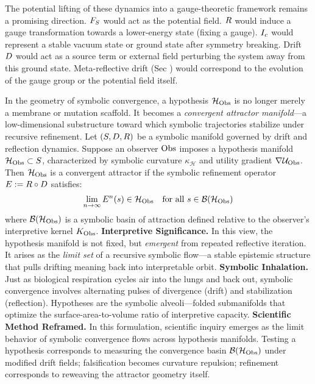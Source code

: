 \begin{remark}
\label{remark:bk7_gauge_theoretic_perspective}
The potential lifting of these dynamics into a gauge-theoretic framework remains a promising direction. \(F_S\) would act as the potential field. \(R\) would induce a gauge transformation towards a lower-energy state (fixing a gauge). \(I_c\) would represent a stable vacuum state or ground state after symmetry breaking. Drift \(D\) would act as a source term or external field perturbing the system away from this ground state. Meta-reflective drift (Sec ) would correspond to the evolution of the gauge group or the potential field itself.
\end{remark}
\begin{scholium}
\label{scholium:bk7_hypotheses_as_convergent_attractor_manifolds}
In the geometry of symbolic convergence, a hypothesis $\mathcal{H}_{\mathrm{Obs}}$ is no longer merely a membrane or mutation scaffold. It becomes a \emph{convergent attractor manifold}—a low-dimensional substructure toward which symbolic trajectories stabilize under recursive refinement. 
Let $(S, D, R)$ be a symbolic manifold governed by drift and reflection dynamics. Suppose an observer $\mathrm{Obs}$ imposes a hypothesis manifold $\mathcal{H}_{\mathrm{Obs}} \subset S$, characterized by symbolic curvature $\kappa_\mathcal{H}$ and utility gradient $\nabla \mathcal{U}_{\mathrm{Obs}}$. Then $\mathcal{H}_{\mathrm{Obs}}$ is a convergent attractor if the symbolic refinement operator $E := R \circ D$ satisfies:
\begin{equation}
\lim_{n \to \infty} E^n(s) \in \mathcal{H}_{\mathrm{Obs}} \quad \text{for all } s \in \mathcal{B}(\mathcal{H}_{\mathrm{Obs}})
\end{equation}
where $\mathcal{B}(\mathcal{H}_{\mathrm{Obs}})$ is a symbolic basin of attraction defined relative to the observer's interpretive kernel $K_{\mathrm{Obs}}$.
\textbf{Interpretive Significance.} In this view, the hypothesis manifold is not fixed, but \emph{emergent} from repeated reflective iteration. It arises as the \textit{limit set} of a recursive symbolic flow—a stable epistemic structure that pulls drifting meaning back into interpretable orbit.
\textbf{Symbolic Inhalation.} Just as biological respiration cycles air into the lungs and back out, symbolic convergence involves alternating pulses of divergence (drift) and stabilization (reflection). Hypotheses are the symbolic alveoli—folded submanifolds that optimize the surface-area-to-volume ratio of interpretive capacity.
\textbf{Scientific Method Reframed.} In this formulation, scientific inquiry emerges as the limit behavior of symbolic convergence flows across hypothesis manifolds. Testing a hypothesis corresponds to measuring the convergence basin $\mathcal{B}(\mathcal{H}_{\mathrm{Obs}})$ under modified drift fields; falsification becomes curvature repulsion; refinement corresponds to reweaving the attractor geometry itself.
\end{scholium}
